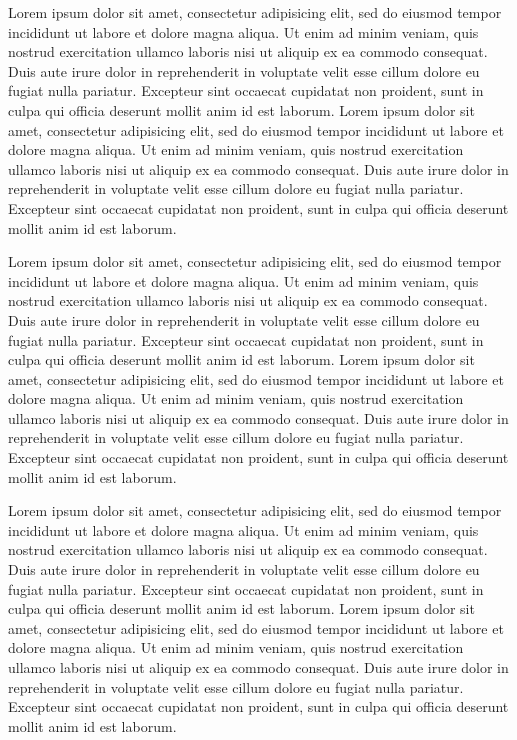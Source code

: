 \documentclass[11t, letterpaper]{awesome-cover}
\begin{document}
\makecvheader

\makelettertitle

\begin{cvletter}
    Lorem ipsum dolor sit amet, consectetur adipisicing elit, sed do eiusmod tempor incididunt ut labore et dolore magna aliqua. Ut enim ad minim veniam, quis nostrud exercitation ullamco laboris nisi ut aliquip ex ea commodo consequat. Duis aute irure dolor in reprehenderit in voluptate velit esse cillum dolore eu fugiat nulla pariatur. Excepteur sint occaecat cupidatat non proident, sunt in culpa qui officia deserunt mollit anim id est laborum. %
    Lorem ipsum dolor sit amet, consectetur adipisicing elit, sed do eiusmod tempor incididunt ut labore et dolore magna aliqua. Ut enim ad minim veniam, quis nostrud exercitation ullamco laboris nisi ut aliquip ex ea commodo consequat. Duis aute irure dolor in reprehenderit in voluptate velit esse cillum dolore eu fugiat nulla pariatur. Excepteur sint occaecat cupidatat non proident, sunt in culpa qui officia deserunt mollit anim id est laborum.

    Lorem ipsum dolor sit amet, consectetur adipisicing elit, sed do eiusmod tempor incididunt ut labore et dolore magna aliqua. Ut enim ad minim veniam, quis nostrud exercitation ullamco laboris nisi ut aliquip ex ea commodo consequat. Duis aute irure dolor in reprehenderit in voluptate velit esse cillum dolore eu fugiat nulla pariatur. Excepteur sint occaecat cupidatat non proident, sunt in culpa qui officia deserunt mollit anim id est laborum. %
    Lorem ipsum dolor sit amet, consectetur adipisicing elit, sed do eiusmod tempor incididunt ut labore et dolore magna aliqua. Ut enim ad minim veniam, quis nostrud exercitation ullamco laboris nisi ut aliquip ex ea commodo consequat. Duis aute irure dolor in reprehenderit in voluptate velit esse cillum dolore eu fugiat nulla pariatur. Excepteur sint occaecat cupidatat non proident, sunt in culpa qui officia deserunt mollit anim id est laborum.

    Lorem ipsum dolor sit amet, consectetur adipisicing elit, sed do eiusmod tempor incididunt ut labore et dolore magna aliqua. Ut enim ad minim veniam, quis nostrud exercitation ullamco laboris nisi ut aliquip ex ea commodo consequat. Duis aute irure dolor in reprehenderit in voluptate velit esse cillum dolore eu fugiat nulla pariatur. Excepteur sint occaecat cupidatat non proident, sunt in culpa qui officia deserunt mollit anim id est laborum. %
    Lorem ipsum dolor sit amet, consectetur adipisicing elit, sed do eiusmod tempor incididunt ut labore et dolore magna aliqua. Ut enim ad minim veniam, quis nostrud exercitation ullamco laboris nisi ut aliquip ex ea commodo consequat. Duis aute irure dolor in reprehenderit in voluptate velit esse cillum dolore eu fugiat nulla pariatur. Excepteur sint occaecat cupidatat non proident, sunt in culpa qui officia deserunt mollit anim id est laborum.
\end{cvletter}

\makeletterclosing
\end{document}
